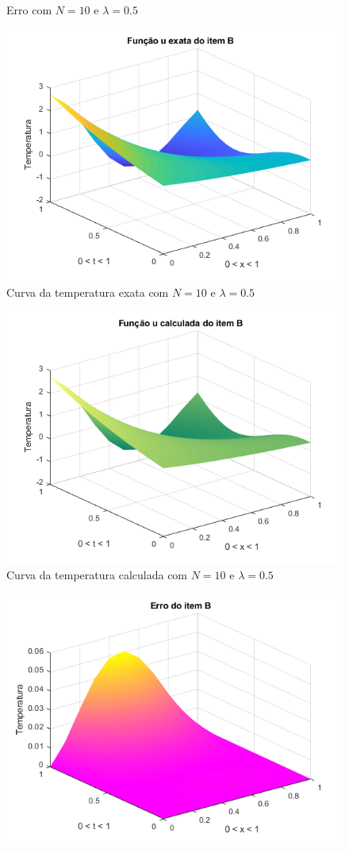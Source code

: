 \documentclass[12pt]{article}
\begin{document}
\begin{spacing}{1.5}
\begin{figure}
    \caption{Erro com $N=10$ e $\lambda=0.5$}
    \label{fig:B_n10lambda0-25_erro}
\end{figure}
\begin{figure}
    \centering
    \includegraphics[width=0.8\linewidth]{Primeira_Tarefa/ItemB/n10_lambda0-5_exata.png}
    \caption{Curva da temperatura exata com $N=10$ e $\lambda=0.5$}
    \label{fig:B_n10lambda0-5_exata}
\end{figure}
\begin{figure}
    \centering
    \includegraphics[width=0.8\linewidth]{Primeira_Tarefa/ItemB/n10_lambda0-5_calc.png}
    \caption{Curva da temperatura calculada com $N=10$ e $\lambda=0.5$}
    \label{fig:B_n10lambda0-5_calc}
\end{figure}
\begin{figure}
    \centering
    \includegraphics[width=0.8\linewidth]{Primeira_Tarefa/ItemB/n10_lambda0-5_erro.png}

\end{figure}
\end{spacing}
\end{document}
